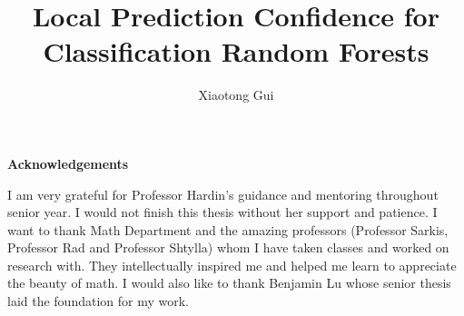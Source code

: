\documentclass[12pt]{pom_thesis}
\author{Xiaotong Gui}
\title{Local Prediction Confidence for Classification Random Forests}
\begin{document}
\maketitle
\newpage
\begin{center}
    {\LARGE\textbf{Acknowledgements}}
\end{center}


{\large I am very grateful for Professor Hardin's guidance and mentoring throughout senior year. I would not finish this thesis without her support and patience. I want to thank Math Department and the amazing professors (Professor Sarkis, Professor Rad and Professor Shtylla) whom I have taken classes and worked on research with. They intellectually inspired me and helped me learn to appreciate the beauty of math. I would also like to thank Benjamin Lu whose senior thesis laid the foundation for my work.}

 \newpage


\tableofcontents




\newpage
{}
\end{document}
